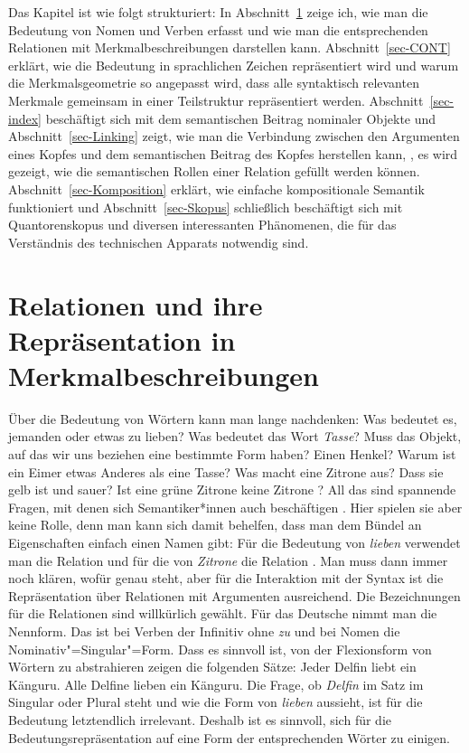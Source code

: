 Das Kapitel ist wie folgt strukturiert: In Abschnitt~\ref{sec-Relationen-und-Merkmalbeschreibungen}
zeige ich, wie man die Bedeutung von Nomen und Verben erfasst und wie man die entsprechenden
Relationen mit Merkmalbeschreibungen darstellen kann. Abschnitt~\ref{sec-CONT} erklärt, wie die
Bedeutung in sprachlichen Zeichen repräsentiert wird und warum die Merkmalsgeometrie so angepasst
wird, dass alle syntaktisch relevanten Merkmale gemeinsam in einer Teilstruktur repräsentiert
werden. Abschnitt~\ref{sec-index} beschäftigt sich mit dem semantischen Beitrag nominaler Objekte
und Abschnitt~\ref{sec-Linking}
zeigt, wie man die Verbindung zwischen den Argumenten eines Kopfes und dem semantischen Beitrag des
Kopfes herstellen kann, \dash, es wird gezeigt, wie die semantischen Rollen einer Relation gefüllt
werden können. Abschnitt~\ref{sec-Komposition} erklärt, wie einfache kompositionale Semantik
funktioniert und Abschnitt~\ref{sec-Skopus} schließlich beschäftigt sich mit Quantorenskopus und
diversen interessanten Phänomenen, die für das Verständnis des technischen Apparats notwendig sind.




\section{Relationen und ihre Repräsentation in Merkmalbeschreibungen}
\label{sec-Relationen-und-Merkmalbeschreibungen}

Über die Bedeutung von Wörtern kann man lange nachdenken: Was bedeutet es, jemanden oder etwas zu
lieben? Was bedeutet das Wort \emph{Tasse}? Muss das Objekt, auf das wir uns beziehen eine bestimmte
Form haben? Einen Henkel? Warum ist ein Eimer etwas Anderes als eine Tasse? Was macht eine Zitrone
aus? Dass sie gelb ist und sauer? Ist eine grüne Zitrone keine Zitrone \citep{Braisby90}? All das sind spannende
Fragen, mit denen sich Semantiker*innen auch beschäftigen \citep{Rosch1973b-u}. Hier spielen sie aber keine Rolle, denn
man kann sich damit behelfen, dass man dem Bündel an Eigenschaften einfach einen Namen gibt: Für die Bedeutung von \emph{lieben} verwendet man die
Relation  und für die von \emph{Zitrone} die Relation . Man muss
dann immer noch klären, wofür  genau steht, aber für die Interaktion mit der
Syntax ist die Repräsentation über Relationen mit Argumenten ausreichend. Die Bezeichnungen für die
Relationen sind willkürlich gewählt. Für das Deutsche nimmt man die Nennform. Das ist bei Verben der
Infinitiv ohne \emph{zu} und bei Nomen die Nominativ"=Singular"=Form. Dass es sinnvoll ist, von der
Flexionsform von Wörtern zu abstrahieren zeigen die folgenden Sätze:
\eal
\label{ex-Alle-Delfine}
\ex Jeder Delfin liebt ein Känguru.
\ex Alle Delfine lieben ein Känguru.
\zl
Die Frage, ob \emph{Delfin} im Satz im Singular oder Plural steht und wie die Form von \emph{lieben}
aussieht, ist für die Bedeutung letztendlich irrelevant. Deshalb ist es sinnvoll, sich für die
Bedeutungsrepräsentation auf eine Form der entsprechenden Wörter zu einigen.


